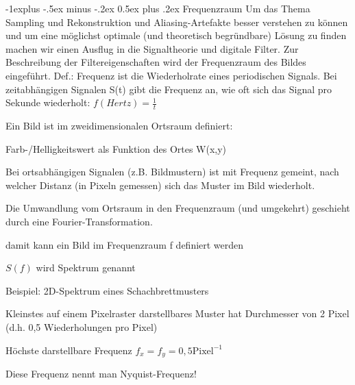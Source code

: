 \documentclass[landscape]{article}
\makeatletter
\renewcommand{\subsection}{\@startsection{subsection}{2}{0mm}%
                                {-1explus -.5ex minus -.2ex}%
                                {0.5ex plus .2ex}%
                                {\normalfont\normalsize\bfseries}}
\makeatother
\begin{document}
\begin{multicols}{3}
  
  \subsection{Frequenzraum}
  Um das Thema Sampling und Rekonstruktion und Aliasing-Artefakte besser verstehen zu können und um eine möglichst optimale (und theoretisch begründbare) Lösung zu finden machen wir einen Ausflug in die Signaltheorie und digitale Filter.
  Zur Beschreibung der Filtereigenschaften wird der Frequenzraum des Bildes eingeführt.
  Def.: Frequenz ist die Wiederholrate eines periodischen Signals. Bei zeitabhängigen Signalen S(t) gibt die Frequenz an, wie oft sich das Signal pro Sekunde wiederholt: $f(Hertz)=\frac{1}{t}$
  
  Ein Bild ist im zweidimensionalen Ortsraum definiert:
  \begin{itemize*}
    \item Farb-/Helligkeitswert als Funktion des Ortes W(x,y)
    \item Bei ortsabhängigen Signalen (z.B. Bildmustern) ist mit Frequenz gemeint, nach welcher Distanz (in Pixeln gemessen) sich das Muster im Bild wiederholt.
    \item Die Umwandlung vom Ortsraum in den Frequenzraum (und umgekehrt) geschieht durch eine Fourier-Transformation.
          \begin{itemize*}
            \item damit kann ein Bild im Frequenzraum f definiert werden
            \item $S(f)$ wird Spektrum genannt
          \end{itemize*}
  \end{itemize*}
  
  
  Beispiel: 2D-Spektrum eines Schachbrettmusters
  \begin{itemize*}
    \item Kleinstes auf einem Pixelraster darstellbares Muster hat Durchmesser von 2 Pixel (d.h. 0,5 Wiederholungen pro Pixel)
    \item Höchste darstellbare Frequenz $f_x = f_y = 0,5 \text{Pixel}^{-1}$
    \item Diese Frequenz nennt man Nyquist-Frequenz!
  \end{itemize*}
  

\end{multicols}
\end{document}
